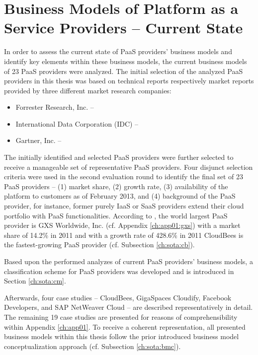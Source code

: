 \chapter{Business Models of Platform as a Service Providers -- Current State}\label{ch:sota}

In order to assess the current state of \ac{PaaS} providers' business models and identify key elements within these business models, the current business models of 23 \ac{PaaS} providers were analyzed. The initial selection of the analyzed \ac{PaaS} providers in this thesis was based on technical reports respectively market reports provided by three different market research companies:
\begin{itemize}[parsep=0pt, topsep=0pt, itemsep=0pt]
	\item Forrester Research, Inc. -- \citet{Rymer2011,Ried2011a}
	\item International Data Corporation (IDC) -- \citet{Bradshaw2012,Hendrick2012, Hendrick2012a}
	\item Gartner, Inc. -- \citet{Smith2012}
\end{itemize}
The initially identified and selected \ac{PaaS} providers were further selected to receive a manageable set of representative \ac{PaaS} providers. Four disjunct selection criteria were used in the second evaluation round to identify the final set of 23 \ac{PaaS} providers -- (1) market share, (2) growth rate, (3) availability of the platform to customers as of February 2013, and (4) background of the \ac{PaaS} provider, for instance, former purely \ac{IaaS} or \ac{SaaS} providers extend their cloud portfolio with \ac{PaaS} functionalities. According to \citet{Hendrick2012}, the world largest \ac{PaaS} provider is GXS Worldwide, Inc. (cf. Appendix \ref{ch:app01:gxs}) with a market share of 14.2\% in 2011 and with a growth rate of 428.6\% in 2011 CloudBees  is the fastest-growing \ac{PaaS} provider (cf. Subsection \ref{ch:sota:cb}).

Based upon the performed analyzes of current \ac{PaaS} providers' business models, a classification scheme for \ac{PaaS} providers was developed and is introduced in Section \ref{ch:sota:cm}.

Afterwards, four case studies -- CloudBees, GigaSpaces Cloudify, Facebook Developers, and SAP NetWeaver Cloud -- are described representatively in detail. The remaining 19 case studies are presented for reasons of comprehensibility within Appendix \ref{ch:app01}. To receive a coherent representation, all presented business models within this thesis follow the prior introduced business model conceptualization approach (cf. Subsection \ref{ch:sota:bmc}).

